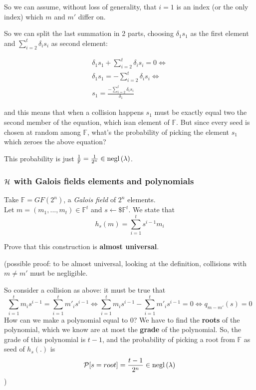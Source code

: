 So we can assume, without loss of generality, that $i=1$ is an index (or the only index) which $m$ and $m'$ differ on.

So we can split the last summation in 2 parts, choosing $\delta_{1}s_{1}$ as the first element and $ \sum_{i=2}^{t} \delta_{i}s_{i}$ as second element:

\begin{gather*}
    \delta_{1}s_{1}+\sum_{i=2}^{t} \delta_{i}s_{i}=0 \Leftrightarrow \\
    \delta_{1}s_{1}=-\sum_{i=2}^{t} \delta_{i}s_{i} \Leftrightarrow \\
    s_{1}=\frac{-\sum_{i=2}^{t} \delta_{i}s_{i}}{\delta_{1}}
\end{gather*}

and this means that when a collision happens $s_{1}$ must be exactly equal two the second member of the equation, which isan element of $\mathbb{F}$. But since every seed is chosen at random among $ \mathbb{F} $, what's the probability of picking the element $s_{1}$ which zeroes the above equation?

This probability is just $\frac{1}{ \mathbb{F} } = \frac{1}{2^{n}} \in \mathrm{negl}\left({\lambda}\right) $.

\subsubsection{$\mathcal{H}$ with Galois fields elements and polynomials}

\begin{construction}
    Take $ \mathbb{F}=GF(2^{n})$, a \textit{Galois field} of $2^{n}$
    elements.\\
    Let $m=(m_{1}, ..., m_{t}) \in \mathbb{F}^{t} $ and $s \leftarrow\$ 
    \mathbb{F}^{t} $. We state that 
    \[
        h_{s}(m)= \sum_{i=1}^{t}s^{i-1}m_{i}
       \]
\end{construction}


\begin{exercise}
    Prove that this construction is \textbf{almost universal}.

    (possible proof: to be almost universal, looking at the definition, collisions with $m \not= m'$ must be negligible.

    So consider a collision as above: it must be true that  
    \[
     \sum_{i=1}^{t} m_{i}s^{i-1}=\sum_{i=1}^{t} m'_{i}s^{i-1} \Leftrightarrow 
     \sum_{i=1}^{t} m_{i}s^{i-1}-\sum_{i=1}^{t} m'_{i}s^{i-1}=0 \Leftrightarrow
     q_{m-m'}(s)=0
    \]
    How can we make a polynomial equal to 0? We have to find the \textbf{roots} of the polynomial, which we know are at most the \textbf{grade} of the polynomial. So, the grade of this polynomial is $t-1$, and the probability of picking a root from $ \mathbb{F} $ as seed of $h_{s}(.)$ is 
    \[
        \mathcal{P} [s=root]=\frac{t-1}{2^{n}}   \in \mathrm{negl}\left({\lambda}\right) 
    \] )
\end{exercise}
 